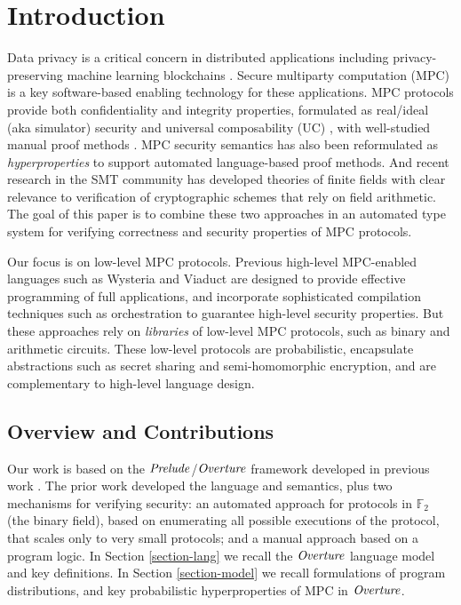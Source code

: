 \section{Introduction}

Data privacy is a critical concern in distributed applications
including privacy-preserving machine learning
\cite{li2021privacy,knott2021crypten,koch2020privacy,liu2020privacy}
blockchains
\cite{ishai2009zero,lu2019honeybadgermpc,gao2022symmeproof,tomaz2020preserving}.
Secure multiparty computation (MPC) is a key software-based enabling
technology for these applications. MPC protocols provide both confidentiality
and integrity properties, formulated as real/ideal (aka simulator)
security and universal composability (UC) \cite{evans2018pragmatic},
with well-studied manual proof methods \cite{Lindell2017}.  MPC
security semantics has also been reformulated as
\emph{hyperproperties}
\cite{8429300,10.1145/3453483.3454074,skalka-near-ppdp24} to support
automated language-based proof methods. And recent research in the SMT
community has developed theories of finite fields \cite{SMFF} with
clear relevance to verification of cryptographic schemes that rely on
field arithmetic. The goal of this paper is to combine these two
approaches in an automated type system for verifying correctness and
security properties of MPC protocols.

Our focus is on low-level MPC protocols. Previous high-level
MPC-enabled languages such as Wysteria \cite{rastogi2014wysteria} and
Viaduct \cite{10.1145/3453483.3454074} are designed to provide
effective programming of full applications, and incorporate
sophisticated compilation techniques such as orchestration
\cite{viaduct-UC} to guarantee high-level security properties. But
these approaches rely on \emph{libraries} of low-level MPC protocols,
such as binary and arithmetic circuits. These low-level protocols are
probabilistic, encapsulate abstractions such as secret sharing and
semi-homomorphic encryption, and are complementary to high-level
language design.

\subsection{Overview and Contributions}

Our work is based on the $\mathit{Prelude}$/$\mathit{Overture}$ framework developed in
previous work \cite{skalka-near-ppdp24}. The prior work developed the 
language and semantics, plus two mechanisms for verifying security: an
automated approach for protocols in $\mathbb{F}_2$ (the binary field),
based on enumerating all possible executions of the protocol, that scales 
only to very small protocols; and a manual approach based on a program logic.
%
In Section \ref{section-lang} we recall the $\mathit{Overture}$ language model and key definitions. In
Section \ref{section-model} we recall formulations of program distributions,
and key probabilistic hyperproperties of MPC in $\mathit{Overture}$. 

